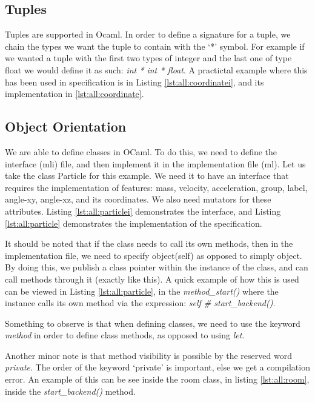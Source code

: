 \subsection{Tuples}

Tuples are supported in Ocaml. In order to define a signature for a tuple, we
chain the types we want the tuple to contain with the ‘*’ symbol. For example
if we wanted a tuple with the first two types of integer and the last one of
type float we would define it as such: \textit{int * int * float}. A practictal
example where this has been used in specification is in Listing
\ref{lst:all:coordinatei}, and its implementation in
\ref{lst:all:coordinate}.

\subsection{Object Orientation}

We are able to define classes in OCaml. To do this, we need to define the
interface (mli) file, and then implement it in the implementation file (ml).
Let us take the class Particle for this example. We need it to have an
interface that requires the implementation of features: mass, velocity,
acceleration, group, label, angle-xy, angle-xz, and its coordinates. We also
need mutators for these attributes. Listing \ref{lst:all:particlei} demonstrates
the interface, and Listing \ref{lst:all:particle} demonstrates the
implementation of the specification.

It should be noted that if the class needs to call its own methods, then in the
implementation file, we need to specify object(self) as opposed to simply
object. By doing this, we publish a class pointer within the instance of the
class, and can call methods through it (exactly like this). A quick example of
how this is used can be viewed in Listing \ref{lst:all:particle}, in the
\textit{method\_start()} where the instance calls its own method via the
expression: \textit{self \# start\_backend()}.

Something to observe is that when defining classes, we need to use the keyword
\textit{method } in order to define class methods, as opposed to using \textit{let}.

Another minor note is that method visibility is possible by the reserved word
\textit{private}. The order of the keyword `private' is important, else we get a
compilation error. An example of this can be see inside the room class, in 
listing \ref{lst:all:room}, inside the \textit{start\_backend()} method.


